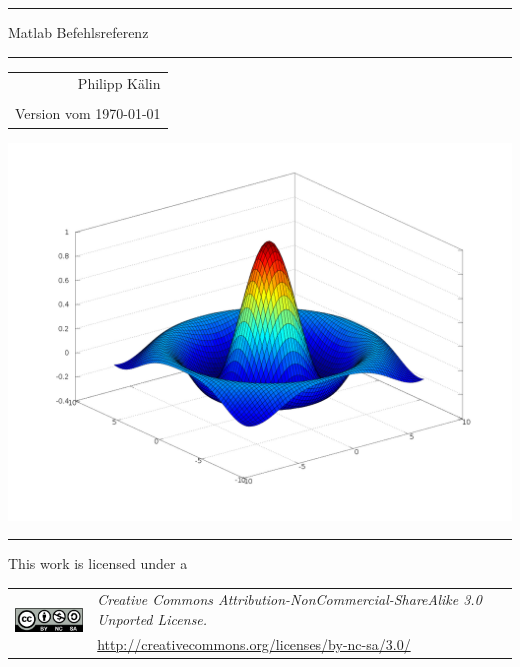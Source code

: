 \def\thickhrulefill{\leavevmode \leaders \hrule height 1pt\hfill \kern \z@}

\begin{titlepage}
    \vspace{10cm} %
    \hrule height 4pt
    \begin{flushleft}
      \huge Matlab Befehlsreferenz
    \end{flushleft}
    \hrule height 4pt
    \par
    \begin{flushright}
      \begin{tabular}{r}
        \LARGE Philipp Kälin \\
        \hspace{1mm} \\
        \LARGE Version vom \today
      \end{tabular}
    \end{flushright}
    
    \vfill
      \begin{center}
        \includegraphics[width=20cm]{lorenz.png}
      \end{center}
    \vfill
    
    \hrule height 1.75pt \vspace{1mm}
    This work is licensed under a \newline
    \begin{tabular}{ll}
        \multirow{3}{*}{\includegraphics[height=1cm]{by-nc-sa.png}} &
        \textit{Creative Commons Attribution-NonCommercial-ShareAlike 3.0
        Unported License.}
      \\
        &
        \url{http://creativecommons.org/licenses/by-nc-sa/3.0/}
    \end{tabular}
\end{titlepage}%
\setcounter{footnote}{0}%